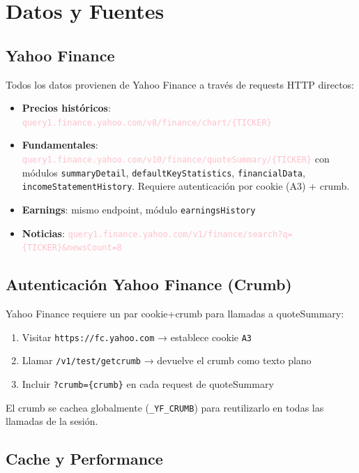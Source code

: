 \documentclass[11pt, a4paper]{article}
\newcommand{\api}[1]{\texttt{\textcolor{pink}{#1}}}
\newcommand{\code}[1]{\texttt{#1}}
\begin{document}
\newpage

\section{Datos y Fuentes}

\subsection{Yahoo Finance}

Todos los datos provienen de Yahoo Finance a través de requests HTTP directos:

\begin{itemize}
  \item \textbf{Precios históricos}: \api{query1.finance.yahoo.com/v8/finance/chart/\{TICKER\}}
  \item \textbf{Fundamentales}: \api{query1.finance.yahoo.com/v10/finance/quoteSummary/\{TICKER\}} con módulos \code{summaryDetail}, \code{defaultKeyStatistics}, \code{financialData}, \code{incomeStatementHistory}. Requiere autenticación por cookie (A3) + crumb.
  \item \textbf{Earnings}: mismo endpoint, módulo \code{earningsHistory}
  \item \textbf{Noticias}: \api{query1.finance.yahoo.com/v1/finance/search?q=\{TICKER\}\&newsCount=8}
\end{itemize}

\subsection{Autenticación Yahoo Finance (Crumb)}

Yahoo Finance requiere un par cookie+crumb para llamadas a quoteSummary:
\begin{enumerate}
  \item Visitar \code{https://fc.yahoo.com} → establece cookie \code{A3}
  \item Llamar \code{/v1/test/getcrumb} → devuelve el crumb como texto plano
  \item Incluir \code{?crumb=\{crumb\}} en cada request de quoteSummary
\end{enumerate}

El crumb se cachea globalmente (\code{\_YF\_CRUMB}) para reutilizarlo en todas las llamadas de la sesión.

\subsection{Cache y Performance}
\end{document}
